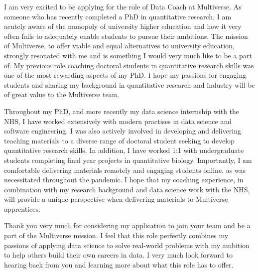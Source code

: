 I am very excited to be applying for the role of Data Coach at Multiverse.
As someone who has recently completed a PhD in quantitative research, I am acutely aware of the monopoly of university higher education and how it very often fails to adequately enable students to pursue their ambitions.
The mission of Multiverse, to offer viable and equal alternatives to university education, strongly resonated with me and is something I would very much like to be a part of.
My previous role coaching doctoral students in quantitative research skills was one of the most rewarding aspects of my PhD.
I hope my passions for engaging students and sharing my background in quantitative research and industry will be of great value to the Multiverse team.


Throughout my PhD, and more recently my data science internship with the NHS, I have worked extensively with modern practises in data science and software engineering.
I was also actively involved in developing and delivering teaching materials to a diverse range of doctoral student seeking to develop quantitative research skills.
In addition, I have worked 1:1 with undergraduate students completing final year projects in quantitative biology.
Importantly, I am comfortable delivering materials remotely and engaging students online, as was necessitated throughout the pandemic.
I hope that my coaching experience, in combination with my research background and data science work with the NHS, will provide a unique perspective when delivering materials to Multiverse apprentices. 

Thank you very much for considering my application to join your team and be a part of the Multiverse mission.
I feel that this role perfectly combines my passions of applying data science to solve real-world problems with my ambition to help others build their own careers in data.
I very much look forward to hearing back from you and learning more about what this role has to offer.
 